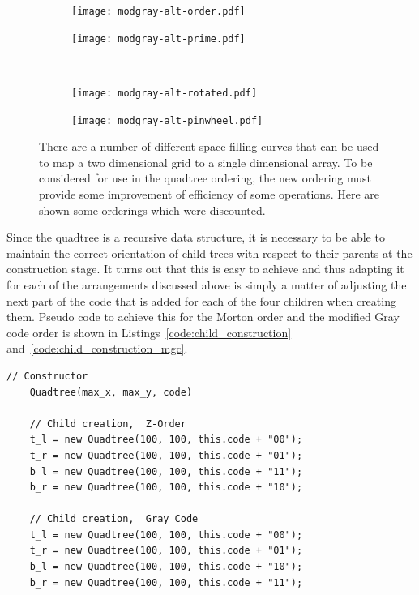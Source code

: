 \begin{figure}[tbhp]
	\centering
	\begin{subfigure}[b]{3.5cm}
		\texttt{[image: modgray-alt-order.pdf]}
		\caption{}\label{fig:modgray-alt-order.pdf}
	\end{subfigure}%
	\quad
	\begin{subfigure}[b]{3.5cm}
		\texttt{[image: modgray-alt-prime.pdf]}
		\caption{}\label{fig:modgray-alt-prime.pdf}
	\end{subfigure}
	\\[0.2cm]
	\begin{subfigure}[b]{3.5cm}
		\texttt{[image: modgray-alt-rotated.pdf]}
		\caption{}\label{fig:modgray-alt-rotated.pdf}
	\end{subfigure}%
	\quad
	\begin{subfigure}[b]{3.5cm}
		\texttt{[image: modgray-alt-pinwheel.pdf]}
		\caption{}\label{fig:modgray-alt-pinwheel.pdf}
	\end{subfigure}

	\caption[Alternative quadtree orderings.]{There are a number of different
		space filling curves that can be used to map a two dimensional grid to
		a single dimensional array. To be considered for use in the quadtree
		ordering, the new ordering must provide some improvement of efficiency
		of some operations. Here are shown some orderings which were
		discounted.}\label{fig:modgray-2-alternatives}
\end{figure}

Since the quadtree is a recursive data structure, it is necessary to be able to
maintain the correct orientation of child trees with respect to their parents
at the construction stage. It turns out that this is easy to achieve and thus
adapting it for each of the arrangements discussed above is simply a matter of
adjusting the next part of the code that is added for each of the four children
when creating them. Pseudo code to achieve this for the Morton order and the
modified Gray code order is shown in Listings~\ref{code:child_construction}
and~\ref{code:child_construction_mgc}.

\begin{lstlisting}[caption={Code to generate children of the current quadtree
while maintaining the correct ordering. Z- and Gray ordering.},
label=code:child_construction]
	// Constructor
	Quadtree(max_x, max_y, code)

	// Child creation,  Z-Order
	t_l = new Quadtree(100, 100, this.code + "00");
	t_r = new Quadtree(100, 100, this.code + "01");
	b_l = new Quadtree(100, 100, this.code + "11");
	b_r = new Quadtree(100, 100, this.code + "10");

	// Child creation,  Gray Code
	t_l = new Quadtree(100, 100, this.code + "00");
	t_r = new Quadtree(100, 100, this.code + "01");
	b_l = new Quadtree(100, 100, this.code + "10");
	b_r = new Quadtree(100, 100, this.code + "11");
\end{lstlisting}

